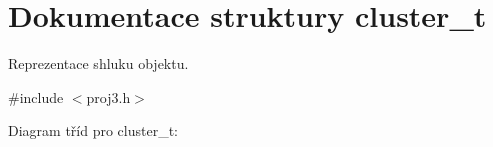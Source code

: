 \hypertarget{structcluster__t}{}\section{Dokumentace struktury cluster\+\_\+t}
\label{structcluster__t}


Reprezentace shluku objektu.  




{\ttfamily \#include $<$proj3.\+h$>$}



Diagram tříd pro cluster\+\_\+t\+:
